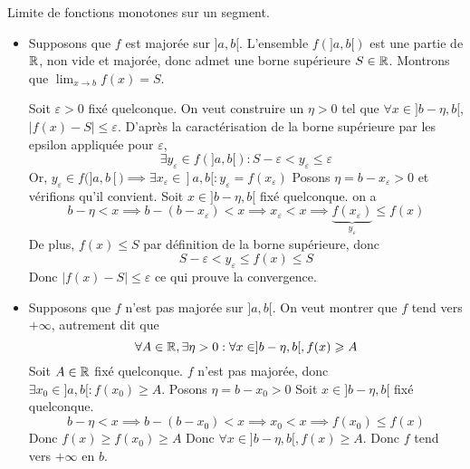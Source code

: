 \documentclass{article}
\begin{document}
{Limite de fonctions monotones sur un segment.}
	\begin{itemize}[label=$\star$]
		\item Supposons que $f$ est majorée sur $]a, b[$. L'ensemble $f(]a, b[)$ est une partie de $\mathbb R$, non vide et majorée, donc admet une borne supérieure $S \in \mathbb R$.
						      Montrons que $\lim_{ x \to b }f(x) = S$.

						      Soit $\varepsilon>0$ fixé quelconque. On veut construire un $\eta>0$ tel que $\forall x \in ]b-\eta, b[$, $\lvert f(x) - S \rvert \leqslant \varepsilon$.
						      D'après la caractérisation de la borne supérieure par les epsilon appliquée pour $\varepsilon$, $$\exists y_{\varepsilon} \in f(]a, b[) : S - \varepsilon < y_{\varepsilon} \leqslant \varepsilon$$
					      Or, $y_{\varepsilon} \in f(]a, b[) \implies \exists x_{\varepsilon}\in ]a, b[ : y_{\varepsilon} = f(x_{\varepsilon})$
						      Posons $\eta = b - x_{\varepsilon} > 0$ et vérifions qu'il convient.
						      Soit $x \in ]b - \eta, b[$ fixé quelconque.
		      on a $$
			      b-\eta < x \implies b- (b - x_{\varepsilon})< x \implies x_{\varepsilon} < x \implies \underbrace{ f(x_{\varepsilon}) }_{ y_{\varepsilon} } \leqslant f(x)
		      $$
		      De plus, $f(x) \leqslant S$ par définition de la borne supérieure, donc
		      $$
			      S - \varepsilon < y_{\varepsilon} \leqslant f(x) \leqslant S
		      $$
		      Donc $\lvert f(x) - S \rvert \leqslant \varepsilon$ ce qui prouve la convergence.

		\item Supposons que $f$ n'est pas majorée sur $]a, b[$.
						      On veut montrer que $f$ tend vers $+\infty$, autrement dit que
					      $$
					      \forall A \in \mathbb R, \exists \eta >0 : \forall x \in ]b- \eta , b[, f(x)\geqslant A
					      $$
					      Soit $A \in \mathbb R$ fixé quelconque.
					      $f$ n'est pas majorée, donc $\exists x_{0} \in ]a, b[ : f(x_{0}) \geqslant A$.
						      Posons $\eta = b - x_{0} > 0$
						      Soit $x \in ]b-\eta, b[$ fixé quelconque.
		      $$
			      b-\eta< x \implies b-(b-x_{0})< x \implies x_{0}<x \implies f(x_{0}) \leqslant f(x)
		      $$
		      Donc $f(x) \geqslant f(x_{0})\geqslant A$
		      Donc $\forall x \in ]b-\eta, b[, f(x) \geqslant A$.
		      Donc $f$ tend vers $+\infty$ en $b$.
	\end{itemize}
\end{question_kholle}
\end{document}
